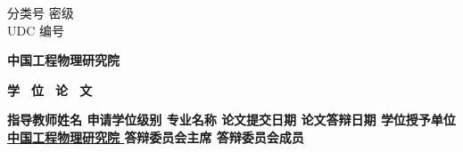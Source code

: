 \pagestyle{empty}
\noindent
分类号
\fixedunderline[4cm]{\theclsnum}
\hfill
密级
\fixedunderline[4cm]{\theconflv} \\
\noindent
UDC \hspace{0.5em}
\fixedunderline[4cm]{\theUDC}
\hfill
编号
\fixedunderline[4cm]{\thethesisnum}

\begin{center}
  \vspace{10pt}
  \bfseries 中国工程物理研究院
  \vspace{0.5em}
\end{center}
\begin{center}
  \bfseries
  学 \, 位 \, 论 \, 文
\end{center}

\begin{center}
  \vspace{10pt}
  \underline{\bfseries \thecntitle}
\end{center}

\begin{center}
  \vspace{20pt}
  \bfseries
  \underline{\thecnauthor}
\end{center}

\vspace{20pt}

{ \noindent
  \bfseries
  \vspace{20pt}
  指导教师姓名 \uline{
    \hfill 
    \printsupervisorcn
    \printsecondsupervisorcn
    \hfill
  }
  \newline
  \vspace{20pt}
  申请学位级别 \uline{
    \hfill \thedgreelevelcn
    \hfill
  }
  专业名称 \uline{
    \hfill \thefieldcn
    \hfill
  }
  \newline
  \vspace{20pt}
  论文提交日期 \uline{
    \hfill \thesubmitdate
    \hfill
  }
  论文答辩日期 \uline{
    \hfill \thedefencedate
    \hfill
  }
  \newline
  \vspace{20pt}
  学位授予单位 \uline{
    \hfill 中国工程物理研究院
    \hfill
  }
  \newline
  \vspace{20pt}
  答辩委员会主席 \uline{
    \hfill \thechairman \hfill
  }
  \newline
  \vspace{20pt}
  答辩委员会成员 \uline{
    \hfill \thereviewer \hfill
}
}

